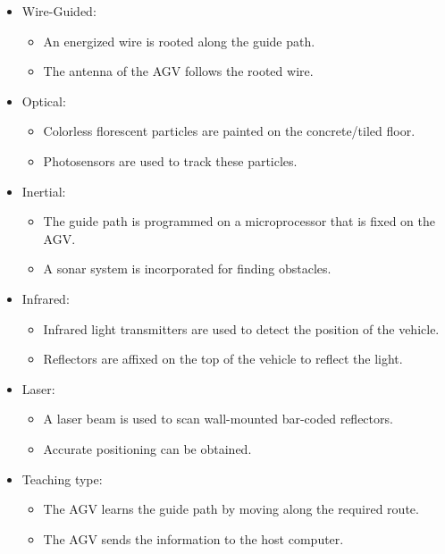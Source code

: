\begin{itemize}
    \item Wire-Guided:
    \begin{itemize}
    \item An energized wire is rooted along the guide path. 
    \item The antenna of the AGV follows the rooted wire.
    \end{itemize}
    \item Optical:
    \begin{itemize}
    \item Colorless florescent particles are painted on the concrete/tiled floor. 
    \item Photosensors are used to track these particles.
    \end{itemize}
    \item Inertial:
    \begin{itemize}
    \item The guide path is programmed on a microprocessor that is fixed on the AGV. 
    \item A sonar system is incorporated for finding obstacles.
    \end{itemize}
    \item Infrared:
    \begin{itemize}
    \item Infrared light transmitters are used to detect the position of the vehicle.
    \item Reflectors are affixed on the top of the vehicle to reflect the light.
    \end{itemize}
    \item Laser:
    \begin{itemize}
    \item A laser beam is used to scan wall-mounted bar-coded reflectors.
    \item Accurate positioning can be obtained.
    \end{itemize}
    \item Teaching type:
    \begin{itemize}
    \item The AGV learns the guide path by moving along the required route.
    \item The AGV sends the information to the host computer.
    \end{itemize}
\end{itemize}

